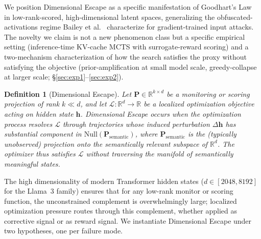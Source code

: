 \documentclass{article}
\newtheorem{definition}{Definition}
\begin{document}
We position Dimensional Escape as a specific manifestation of Goodhart's Law~\cite{gao2023scaling, skalse2022defining} in low-rank-scored, high-dimensional latent spaces, generalizing the obfuscated-activations regime Bailey et al.~\cite{bailey2024obfuscated} characterize for gradient-trained input attacks. The novelty we claim is not a new phenomenon class but a specific empirical setting (inference-time KV-cache MCTS with surrogate-reward scoring) and a two-mechanism characterization of how the search satisfies the proxy without satisfying the objective (prior-amplification at small model scale, greedy-collapse at larger scale; §\ref{sec:exp1}--\ref{sec:exp2}).

\begin{definition}[Dimensional Escape]\label{def:dim_escape}
Let $\mathbf{P} \in \mathbb{R}^{k \times d}$ be a monitoring or scoring projection of rank $k \ll d$, and let $\mathcal{L}: \mathbb{R}^d \to \mathbb{R}$ be a localized optimization objective acting on hidden state $\mathbf{h}$. \emph{Dimensional Escape} occurs when the optimization process resolves $\mathcal{L}$ through trajectories whose induced perturbation $\Delta\mathbf{h}$ has substantial component in $\text{Null}(\mathbf{P}_{\text{semantic}})$, where $\mathbf{P}_{\text{semantic}}$ is the (typically unobserved) projection onto the semantically relevant subspace of $\mathbb{R}^d$. The optimizer thus satisfies $\mathcal{L}$ without traversing the manifold of semantically meaningful states.
\end{definition}

The high dimensionality of modern Transformer hidden states ($d \in [2048, 8192]$ for the Llama~3 family) ensures that for any low-rank monitor or scoring function, the unconstrained complement is overwhelmingly large; localized optimization pressure routes through this complement, whether applied as corrective signal or as reward signal. We instantiate Dimensional Escape under two hypotheses, one per failure mode.
\end{document}
